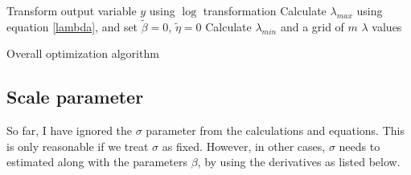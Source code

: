 \documentclass[12pt,a4paper]{report}
\begin{document}
\begin{algorithm}[H]
\SetAlgoLined
 Transform output variable $y$ using $\log$ transformation \;
 Calculate $\lambda_{max}$ using equation \ref{lambda}, and set $\widetilde{\beta} = 0$, $\widetilde{\eta}=0$ \;
 Calculate $\lambda_{min}$ and a grid of $m$ $\lambda$ values \;
 \caption{Overall optimization algorithm}
\end{algorithm}

\subsection*{Scale parameter}
So far, I have ignored the $\sigma$ parameter from the calculations and equations. This is only
reasonable if we treat $\sigma$ as fixed. However, in other cases, $\sigma$ needs to estimated along with the parameters $\beta$, by using the derivatives as listed below.
\end{document}
